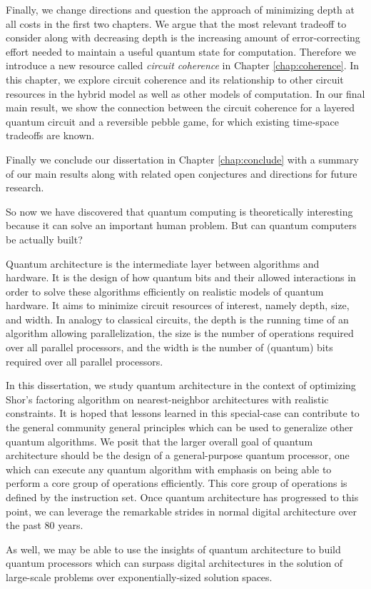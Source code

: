 Finally, we change directions and question the approach of minimizing depth
at all costs in the first two chapters. We argue that the most relevant
tradeoff to consider along with decreasing depth is the increasing amount
of error-correcting effort needed to maintain a useful quantum state for
computation. Therefore we introduce a new resource called
\emph{circuit coherence} in Chapter \ref{chap:coherence}. In this chapter,
we explore circuit coherence and its relationship to other circuit resources
in the hybrid model as well as other models of computation. In our final
main result, we show the connection between the circuit coherence for a
layered quantum circuit and a reversible pebble game, for which existing
time-space tradeoffs are known.

Finally we conclude our dissertation in Chapter \ref{chap:conclude} with a
summary of our main results along with related open conjectures and
directions for future research.









So now we have discovered that quantum computing is theoretically interesting
because it can solve an important human problem. But can quantum computers be
actually built?

Quantum architecture is the intermediate layer between algorithms and hardware.
It is the design of how quantum bits and their allowed interactions in order
to solve these algorithms efficiently on realistic models of quantum hardware.
It aims to minimize circuit resources of interest, namely depth, size, and
width. In analogy to classical circuits, the depth is the running time of an
algorithm allowing parallelization, the size is the number of operations
required over all parallel processors, and the width is the number of
(quantum) bits required over all parallel processors.

In this dissertation, we study quantum architecture in the context of
optimizing Shor's factoring algorithm on nearest-neighbor architectures with
realistic constraints. It is hoped that lessons learned in this special-case
can contribute to the general community general principles which can be used
to generalize other quantum algorithms. We posit that the larger overall goal
of quantum architecture should be the design of a general-purpose quantum
processor, one which can execute any quantum algorithm with emphasis on being
able to perform a core group of operations efficiently. This core group of
operations is defined by the instruction set. Once quantum architecture has
progressed to this point, we can leverage the remarkable strides in normal
digital architecture over the past 80 years.

As well, we may be able to use the insights of quantum architecture to build
quantum processors which can surpass digital architectures in the solution of
large-scale problems over exponentially-sized solution spaces.
